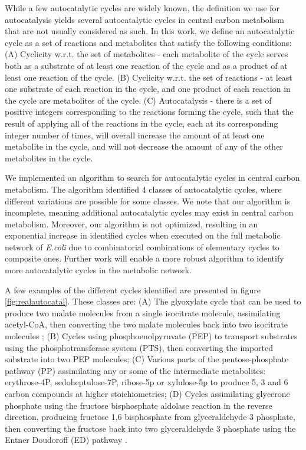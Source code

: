 \documentclass[a4page,notitlepage]{article}
\begin{document}
While a few autocatalytic cycles are widely known, the definition we use for autocatalysis yields several autocatalytic cycles in central carbon metabolism that are not usually considered as such.
In this work, we define an autocatalytic cycle as a set of reactions and metabolites that satisfy the following conditions:
(A) Cyclicity w.r.t. the set of metabolites - each metabolite of the cycle serves both as a substrate of at least one reaction of the cycle and as a product of at least one reaction of the cycle.
(B) Cyclicity w.r.t. the set of reactions - at least one substrate of each reaction in the cycle, and one product of each reaction in the cycle are metabolites of the cycle.
(C) Autocatalysis - there is a set of positive integers corresponding to the reactions forming the cycle, such that the result of applying all of the reactions in the cycle, each at its corresponding integer number of times, will overall increase the amount of at least one metabolite in the cycle, and will not decrease the amount of any of the other metabolites in the cycle.

We implemented an algorithm to search for autocatalytic cycles in central carbon metabolism.
The algorithm identified 4 classes of autocatalytic cycles, where different variations are possible for some classes.
We note that our algorithm is incomplete, meaning additional autocatalytic cycles may exist in central carbon metabolism.
Moreover, our algorithm is not optimized, resulting in an exponential increase in identified cycles when executed on the full metabolic network of \emph{E.coli} due to combinatorial combinations of elementary cycles to composite ones.
Further work will enable a more robust algorithm to identify more autocatalytic cycles in the metabolic network.

A few examples of the different cycles identified  are presented in figure \ref{fig:realautocatal}.
These classes are:
(A) The glyoxylate cycle that can be used to produce two malate molecules from a single isocitrate molecule, assimilating acetyl-CoA, then converting the two malate molecules back into two isocitrate molecules \cite{Kornberg1966-lh};
(B) Cycles using phosphoenolpyruvate (PEP) to transport substrates using the phosphotransferase system (PTS), then converting the imported substrate into two PEP molecules;
(C) Various parts of the pentose-phosphate pathway (PP) assimilating any or some of the intermediate metabolites: erythrose-4P, sedoheptulose-7P, ribose-5p or xylulose-5p to produce 5, 3 and 6 carbon compounds at higher stoichiometries;
(D) Cycles assimilating glycerone phosphate using the fructose bisphosphate aldolase reaction in the reverse direction, producing fructose 1,6 bisphosphate from glyceraldehyde 3 phosphate, then converting the fructose back into two glyceraldehyde 3 phosphate using the Entner Doudoroff (ED) pathway \cite{Entner1952-xs}.
\end{document}
